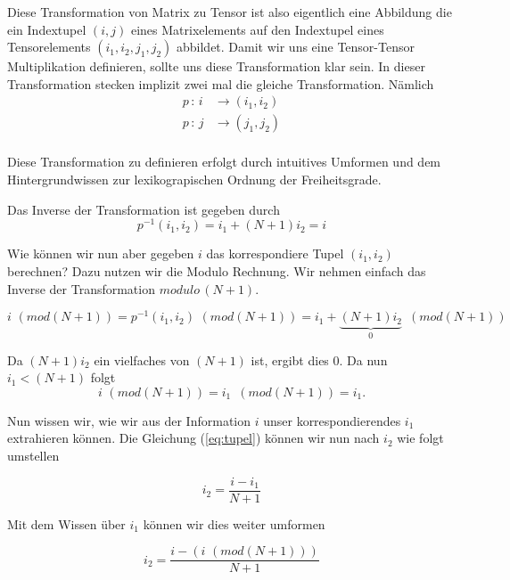 Diese Transformation von Matrix zu Tensor ist also eigentlich eine Abbildung die ein Indextupel $(i,j)$ eines Matrixelements auf den Indextupel eines Tensorelements $(i_1,i_2,j_1,j_2)$ abbildet. Damit wir uns eine Tensor-Tensor Multiplikation definieren, sollte uns diese Transformation klar sein.
In dieser Transformation stecken implizit zwei mal die gleiche Transformation. Nämlich
\begin{equation*}
\begin{aligned}
p \, : \, i &\rightarrow (i_1,i_2) \\
p \, : \, j &\rightarrow (j_1,j_2) \\
\end{aligned}
\end{equation*}

Diese Transformation zu definieren erfolgt durch intuitives Umformen und dem Hintergrundwissen zur lexikograpischen Ordnung der Freiheitsgrade.

Das Inverse der Transformation ist gegeben durch
\begin{equation} \label{eq:tupel}
p^{-1}(i_1,i_2) = i_1 + (N+1)i_2 = i
\end{equation}

Wie können wir nun aber gegeben $i$ das korrespondiere Tupel $(i_1,i_2)$ berechnen?
Dazu nutzen wir die Modulo Rechnung. Wir nehmen einfach das Inverse der Transformation $modulo \, (N+1)$. 

\begin{equation}
i \, \, (mod (N+1))=p^{-1}(i_1,i_2) \, \, (mod (N+1)) = i_1 + \underbrace{(N+1)i_2}_{0} \, \, \, (mod (N+1)) 
\end{equation}

Da $(N+1)i_2$ ein vielfaches von $(N+1)$ ist, ergibt dies 0. Da nun $i_1 < (N+1)$ folgt 
\begin{equation}
i \, \, (mod (N+1)) = i_1 \, \, \, (mod (N+1)) = i_1.
\end{equation}

Nun wissen wir, wie wir aus der Information $i$ unser korrespondierendes $i_1$ extrahieren können. Die Gleichung (\ref{eq:tupel}) können wir nun nach $i_2$ wie folgt umstellen

\begin{equation} \label{eq:tupel2}
 i_2 = \dfrac{ i - i_1 } {N+1}
\end{equation}

Mit dem Wissen über $i_1$ können wir dies weiter umformen

\begin{equation} \label{eq:tupel3}
 i_2 = \dfrac{ i -  (i \, \, (mod (N+1))) } {N+1}
\end{equation}

